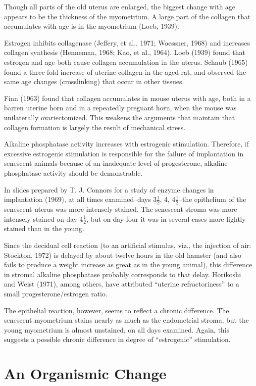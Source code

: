 Though all parts of the old uterus are enlarged, the biggest change with age appears to be the thickness of the myometrium. A large part of the collagen that accumulates with age is in the myometrium (Loeb, 1939).

Estrogen inhibits collagenase (Jeffery, et al., 1971; Woessner, 1968) and increases collagen synthesis (Henneman, 1968; Kao, et al., 1964). Loeb (1939) found that estrogen and age both cause collagen accumulation in the uterus. Schaub (1965) found a three-fold increase of uterine collagen in the aged rat, and observed the same age changes (crosslinking) that occur in other tissues.

Finn (1963) found that collagen accumulates in mouse uterus with age, both in a barren uterine horn and in a repeatedly pregnant horn, when the mouse was unilaterally ovariectomized. This weakens the arguments that maintain that collagen formation is largely the result of mechanical stress.

Alkaline phosphatase activity increases with estrogenic stimulation. Therefore, if excessive estrogenic stimulation is responsible for the failure of implantation in senescent animals because of an inadequate level of progesterone, alkaline phosphatase activity should be demonstrable.

In slides prepared by T. J. Connors for a study of enzyme changes in implantation (1969), at all times examined--days 3$\frac{1}{2}$, 4, 4$\frac{1}{2}$--the epithelium of the senescent uterus was more intensely stained. The senescent stroma was more intensely stained on day 4$\frac{1}{2}$, but on day four it was in several cases more lightly stained than in the young.

Since the decidual cell reaction (to an artificial stimulus, viz., the injection of air: Stockton, 1972) is delayed by about twelve hours in the old hamster (and also fails to produce a weight increase as great as in the young animal), this difference in stromal alkaline phosphatase probably corresponds to that delay. Horikoshi and Weist (1971), among others, have attributed ``uterine refractoriness'' to a small progesterone/estrogen ratio.

The epithelial reaction, however, seems to reflect a chronic difference. The senescent myometrium stains nearly as much as the endometrial stroma, but the young myometrium is almost unstained, on all days examined. Again, this suggests a possible chronic difference in degree of ``estrogenic'' stimulation.

\section{An Organismic Change}

